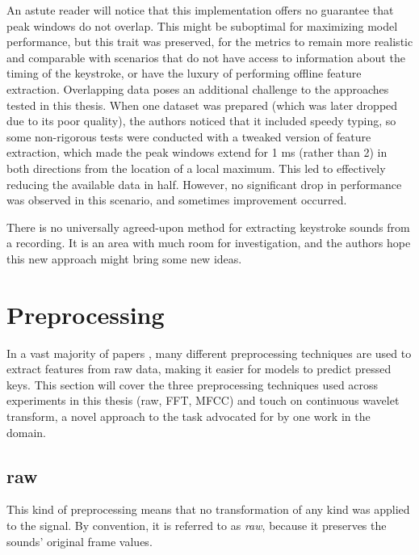 \documentclass[../main.tex]{subfiles}
\begin{document}
An astute reader will notice that this implementation offers no guarantee that peak windows do not overlap.
This might be suboptimal for maximizing model performance, but this trait was preserved, for the metrics
to remain more realistic and comparable with scenarios that do not have access to information about the timing
of the keystroke, or have the luxury of performing offline feature extraction.
Overlapping data poses an additional challenge to the approaches tested in this thesis. 
When one dataset was prepared (which was later dropped due to its poor quality), the authors noticed that 
it included speedy typing, so some non-rigorous tests were conducted with a tweaked version of feature extraction, 
which made the peak windows extend for 1 ms (rather than 2) in both directions from the location of a local maximum.\label{par:g213_poor_quality}
This led to effectively reducing the available data in half. However, no significant drop in performance was observed
in this scenario, and sometimes improvement occurred. 

There is no universally agreed-upon method for extracting keystroke sounds from a recording. It is an area with much room for investigation, and the authors hope this new approach might bring some new ideas.



\section{Preprocessing} \label{sec:dataset_preprocessing}
In a vast majority of papers \cite{og2004, dict2006, skype2019}, many different preprocessing techniques are used to extract features from raw data, making it easier for models to predict pressed keys.
This section will cover the three preprocessing techniques used across experiments in this thesis (raw, FFT, MFCC) and touch on continuous wavelet transform, a novel approach to the task advocated for by one work in the domain.
\subsection{raw}
This kind of preprocessing means that no transformation of any kind was applied to the signal. By convention, it is referred to as \textit{raw}, because it preserves the sounds' original frame values.
\end{document}
